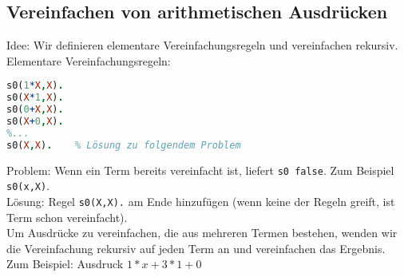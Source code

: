 \subsection{Vereinfachen von arithmetischen Ausdrücken}
Idee: Wir definieren elementare Vereinfachungsregeln und vereinfachen rekursiv.\\
Elementare Vereinfachungsregeln:
\begin{lstlisting}[language=Prolog]
s0(1*X,X).
s0(X*1,X).
s0(0+X,X).
s0(X+0,X).
%...
s0(X,X).	% Lösung zu folgendem Problem
\end{lstlisting}
Problem: Wenn ein Term bereits vereinfacht ist, liefert \lstinline$s0 false$. Zum Beispiel \lstinline$s0(x,X)$.\\
Lösung: Regel \lstinline$s0(X,X).$ am Ende hinzufügen (wenn keine der Regeln greift, ist Term schon vereinfacht).\\
Um Ausdrücke zu vereinfachen, die aus mehreren Termen bestehen, wenden wir die Vereinfachung rekursiv auf jeden Term an und vereinfachen das Ergebnis. Zum Beispiel: Ausdruck $1*x+3*1+0$
\begin{center}
\end{center}






















